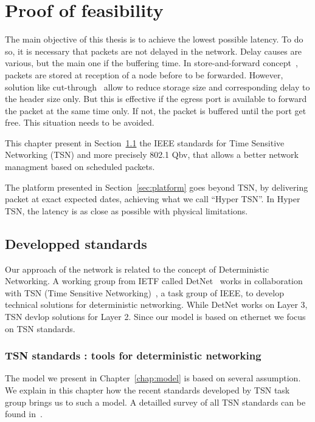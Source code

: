 
\chapter{Proof of feasibility}
\label{chap:TSN}
\minitoc
The main objective of this thesis is to achieve the lowest possible latency. To do so, it is necessary that packets are not delayed in the network. Delay causes are various, but the main one if the buffering time. In store-and-forward concept~\cite{tindell1992store}, packets are stored at reception of a node before to be forwarded. However, solution like cut-through~\cite{kermani1979virtual} allow to reduce storage size and corresponding delay to the header size only. But this is effective if the egress port is available to forward the packet at the same time only. If not, the packet is buffered until the port get free. This situation needs to be avoided.

This chapter present in Section~\ref{sec:TSNqbv} the IEEE standards for Time Sensitive Networking (TSN) and more precisely 802.1 Qbv, that allows a better network managment based on scheduled packets. 

The platform presented in Section~\ref{sec:platform} goes beyond TSN, by delivering packet at exact expected dates, achieving what we call “Hyper TSN”. In Hyper TSN, the latency is as close as possible with physical limitations.


\section{Developped standards}
\label{sec:TSNqbv}
Our approach of the network is related to the concept of Deterministic Networking. A working group from IETF called DetNet~\cite{finn-detnet-architecture-08} works in collaboration with TSN (Time Sensitive Networking)~\cite{ieee802}, a task group of IEEE, to develop technical solutions for deterministic networking. While DetNet works on Layer 3, TSN devlop solutions for Layer 2. Since our model is based on ethernet we focus on TSN standards.

\subsection{TSN standards : tools for deterministic networking}
The model we present in Chapter~\ref{chap:model} is based on several assumption. We explain in this chapter how the recent standards developed by TSN task group brings us to such a model. A detailled survey of all TSN standards can be found in~\cite{Nasrallah_2019}. 


